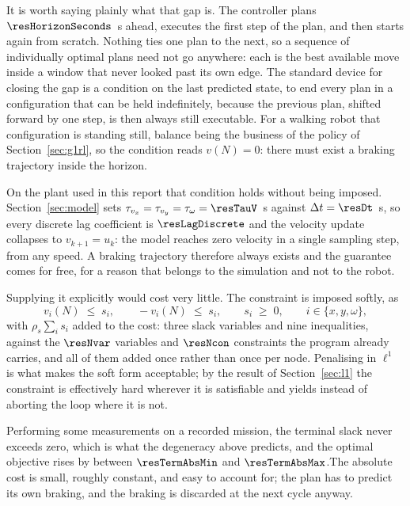 \documentclass[11pt,a4paper]{article}
\begin{document}
It is worth saying plainly what that gap is. The controller plans $\resHorizonSeconds$~s ahead, executes the
first step of the plan, and then starts again from scratch. Nothing ties one plan to the next, so a sequence
of individually optimal plans need not go anywhere: each is the best available move inside a window that
never looked past its own edge. The standard device for closing the gap is a condition on the last predicted
state, to end every plan in a configuration that can be held indefinitely, because the previous plan,
shifted forward by one step, is then always still executable. For a walking robot that configuration is
standing still, balance being the business of the policy of Section~\ref{sec:g1rl}, so the condition reads
$v(N)=0$: there must exist a braking trajectory inside the horizon.

On the plant used in this report that condition holds without being imposed. Section~\ref{sec:model} sets
$\tau_{v_x}=\tau_{v_y}=\tau_\omega=\resTauV$~s against $\Delta t=\resDt$~s, so every discrete lag
coefficient is $\resLagDiscrete$
and the velocity update collapses to $v_{k+1}=u_k$: the model reaches zero velocity in a single sampling
step, from any speed. A braking trajectory therefore always exists and the guarantee comes for free, for
a reason that belongs to the simulation and not to the robot.

Supplying it explicitly would cost very little. The constraint is imposed softly, as
\begin{equation}
  v_i(N)\;\le\;s_i,\qquad -v_i(N)\;\le\;s_i,\qquad s_i\;\ge\;0,\qquad i\in\{x,y,\omega\},
  \label{eq:terminal}
\end{equation}
with $\rho_s\sum_i s_i$ added to the cost: three slack variables and nine inequalities, against the
$\resNvar$ variables and $\resNcon$ constraints the program already carries, and all of them added once
rather than once per node. Penalising in $\ell^1$ is what makes the soft form acceptable; by the result
of Section~\ref{sec:l1} the constraint is effectively hard wherever it is satisfiable and yields instead of
aborting the loop where it is not.

Performing some measurements on a recorded mission, the terminal slack
never exceeds zero, which is what the
degeneracy above predicts, and the optimal objective rises by between $\resTermAbsMin$ and $\resTermAbsMax$.The absolute cost is small,
roughly constant, and easy to account for; the plan has to predict its own braking, and the braking is
discarded at the next cycle anyway.
\end{document}
